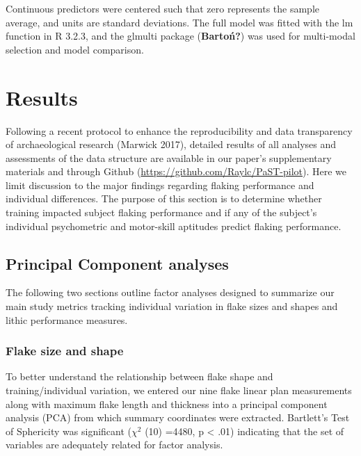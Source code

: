 \documentclass[smallextended]{svjour3}       %
\begin{document}
Continuous predictors were centered such that zero represents the sample
average, and units are standard deviations. The full model was fitted
with the lm function in R 3.2.3, and the glmulti package
(\textbf{Bartoń?}) was used for multi-modal selection and model
comparison.

\hfill\break

\hypertarget{results}{%
\section{\texorpdfstring{\textbf{Results}}{Results}}\label{results}}

Following a recent protocol to enhance the reproducibility and data
transparency of archaeological research (Marwick 2017), detailed results
of all analyses and assessments of the data structure are available in
our paper's supplementary materials and through Github
(\url{https://github.com/Raylc/PaST-pilot}). Here we limit discussion to
the major ﬁndings regarding flaking performance and individual
differences. The purpose of this section is to determine whether
training impacted subject flaking performance and if any of the
subject's individual psychometric and motor-skill aptitudes predict
flaking performance.

\hypertarget{principal-component-analyses}{%
\subsection{\texorpdfstring{\textbf{Principal Component
analyses}}{Principal Component analyses}}\label{principal-component-analyses}}

The following two sections outline factor analyses designed to summarize
our main study metrics tracking individual variation in flake sizes and
shapes and lithic performance measures.

\hypertarget{flake-size-and-shape}{%
\subsubsection{\texorpdfstring{\textbf{Flake size and
shape}}{Flake size and shape}}\label{flake-size-and-shape}}

To better understand the relationship between flake shape and
training/individual variation, we entered our nine flake linear plan
measurements along with maximum flake length and thickness into a
principal component analysis (PCA) from which summary coordinates were
extracted. Bartlett's Test of Sphericity was significant (\(\chi ^2\)
(10) =4480, p \textless{} .01) indicating that the set of variables are
adequately related for factor analysis.
\end{document}
